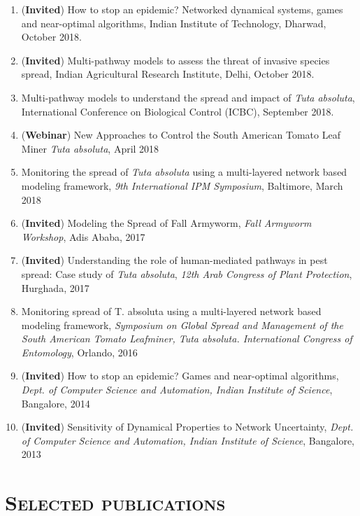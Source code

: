 \documentclass[margin,10pt]{res} %
\begin{document}
\begin{resume}
{\begin{enumerate}[1.]
Species Spread, SIAM Network Science, Snowbird, Utah,
May 2019.
\item (\textbf{Invited}) How to stop an epidemic? Networked dynamical
systems, games and near-optimal algorithms, Indian Institute of
Technology, Dharwad, October 2018.
\item (\textbf{Invited}) Multi-pathway models to assess the threat of
invasive species spread, Indian Agricultural Research Institute, Delhi,
October 2018.
\item Multi-pathway models to understand the spread and impact of
\emph{Tuta
absoluta}, International Conference on Biological Control (ICBC),
September 2018.
\item (\textbf{Webinar}) New Approaches to Control the South American Tomato
Leaf Miner \emph{Tuta absoluta}, April 2018
\item Monitoring the spread of {\it Tuta absoluta} using a
multi-layered network based modeling framework, \emph{9th International
IPM Symposium}, Baltimore, March 2018
    \item (\textbf{Invited}) Modeling the Spread of Fall Armyworm,
    \emph{Fall Armyworm Workshop}, Adis Ababa, 2017
    \item (\textbf{Invited}) Understanding the role of human-mediated
    pathways in pest spread: Case study of \emph{Tuta absoluta}, \emph{12th
    Arab Congress of Plant Protection}, Hurghada, 2017
\item Monitoring spread of T. absoluta using a multi-layered network
based modeling framework, \emph{Symposium on Global Spread and Management
of the South American Tomato Leafminer, Tuta absoluta. International
Congress of Entomology}, Orlando, 2016
\item (\textbf{Invited}) How to stop an epidemic?  Games and near-optimal
algorithms, \emph{Dept. of Computer Science and Automation, Indian
Institute of Science}, Bangalore, 2014
\item (\textbf{Invited}) Sensitivity of Dynamical Properties to Network
Uncertainty, \emph{Dept. of Computer Science and Automation, Indian
Institute of Science}, Bangalore, 2013
\end{enumerate}
}

\section{\textnormal{\textsc{Selected publications}}}
\begin{enumerate}[1.]%

\end{enumerate}


\end{resume}
\end{document}
